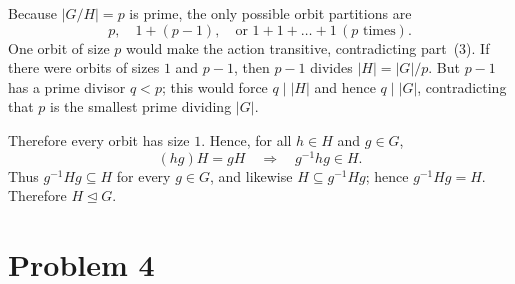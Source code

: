 \documentclass[12pt]{article}
\begin{document}
\begin{enumerate}[label=(\arabic*)]
Because \(|G/H| = p\) is prime, the only possible orbit partitions are
\[
p,\quad 1 + (p-1),\quad \text{or } 1 + 1 + \dots + 1 \,(p\text{ times}).
\]
One orbit of size \(p\) would make the action transitive, contradicting
part~(3).  
If there were orbits of sizes \(1\) and \(p-1\), then \(p-1\) divides
\(|H| = |G|/p\).  But \(p-1\) has a prime divisor \(q < p\); this would
force \(q\mid |H|\) and hence \(q\mid |G|\), contradicting that \(p\) is
the smallest prime dividing \(|G|\).

Therefore every orbit has size \(1\).  Hence, for all \(h\in H\) and
\(g\in G\),
\[
(hg)H = gH \quad\Longrightarrow\quad g^{-1}hg \in H.
\]
Thus \(g^{-1}Hg \subseteq H\) for every \(g\in G\), and likewise
\(H \subseteq g^{-1}Hg\); hence \(g^{-1}Hg = H\).  Therefore
\(H \trianglelefteq G\).

\end{enumerate}

\section*{Problem 4}
\end{document}
